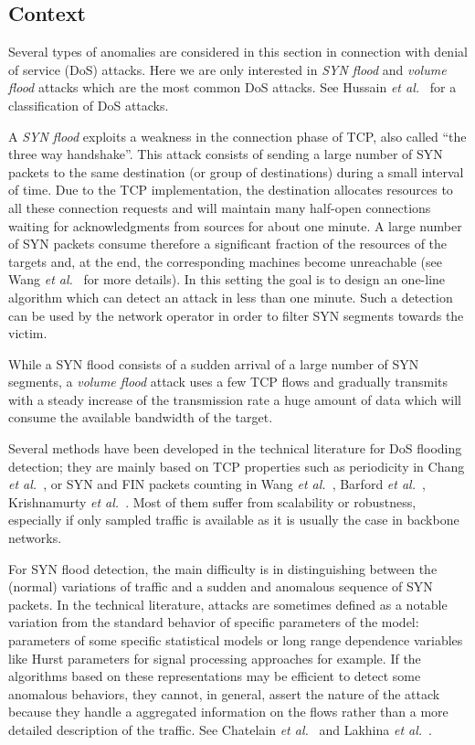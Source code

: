 \documentclass{amsart}
\def\etal{{\em et al.}}
\begin{document}
\subsection{Context}
Several types of anomalies  are considered in this section in connection with   denial
of service (DoS) attacks.   Here  we are only interested  in
{\em SYN flood} and {\em volume flood} attacks which  are the most common DoS attacks. See
Hussain \etal~\cite{Hussain}  for   a  classification   of  DoS attacks. 

A {\em SYN flood} exploits a weakness in the connection phase of TCP, also called ``the three
way handshake''. This attack consists of sending a large number of SYN packets to the same
destination (or group of destinations) during a small interval of time. Due to the TCP
implementation, the destination  allocates resources to all these connection requests
and will maintain many half-open connections waiting for acknowledgments from sources for
about one minute. A large number of SYN packets  consume therefore a significant fraction
of the resources of the targets and, at the end, the corresponding machines become
unreachable  (see Wang  \etal~\cite{Wang} for more details). In this setting the goal is
to design  an one-line algorithm which can detect an attack in less than one minute. Such a
detection can be used by the network operator in order to filter SYN segments towards the
victim.  

While  a  SYN flood consists of a sudden arrival  of a large number of SYN segments, 
a {\em volume flood} attack uses a few TCP flows and gradually transmits with a steady increase
of the transmission rate  a huge amount of data which will consume the available bandwidth
of the target.  

Several methods  have been developed in  the technical literature for  DoS flooding detection; they
are mainly based on TCP properties such as periodicity in Chang \etal~\cite{Cheng}, or SYN
and  FIN  packets  counting   in  Wang  \etal~\cite{Wang},  Barford  \etal~\cite{Barford},
Krishnamurty  \etal~\cite{Krishna}.  Most of  them suffer  from scalability  or robustness,
especially if  only sampled traffic  is available  as it is  usually the case  in backbone
networks.

For SYN  flood detection, the  main difficulty is  in distinguishing between  the (normal)
variations of traffic  and a sudden and anomalous sequence of SYN  packets. In the technical literature,
attacks  are sometimes  defined  as a  notable  variation from  the  standard behavior  of
specific parameters  of the model:  parameters of some specific  statistical models or
long range dependence variables like Hurst parameters for  signal processing approaches
for example. If the algorithms based on these representations may be efficient to detect some anomalous
behaviors, they  cannot, in general, assert the  nature of the attack  because they handle
a aggregated information on the flows rather than a more detailed description of the
traffic.  See Chatelain \etal~\cite{Borgnat} and Lakhina \etal~\cite{Diot}.
\end{document}
